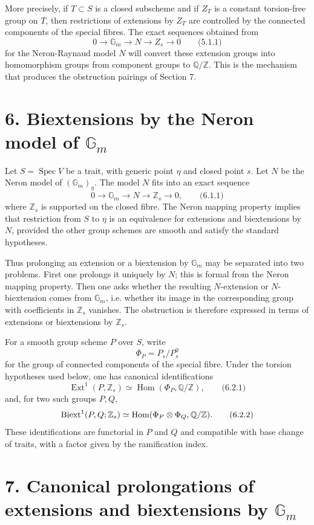 \documentclass[11pt]{article}
\providecommand{\Spec}{\operatorname{Spec}}
\providecommand{\Z}{\mathbb Z}
\providecommand{\Q}{\mathbb Q}
\providecommand{\Gm}{\mathbb G_m}
\providecommand{\Hom}{\operatorname{Hom}}
\providecommand{\Ext}{\operatorname{Ext}}
\begin{document}
More precisely, if \(T\subset S\) is a closed subscheme and if \(Z_T\) is a constant torsion-free group on \(T\), then restrictions of extensions by \(Z_T\) are controlled by the connected components of the special fibres.  The exact sequences obtained from
\[
        0\longrightarrow \Gm\longrightarrow N\longrightarrow Z_s\longrightarrow 0
\qquad\text{(5.1.1)}
\]
for the Neron-Raynaud model \(N\) will convert these extension groups into homomorphism groups from component groups to \(\Q/\Z\).  This is the mechanism that produces the obstruction pairings of Section 7.

\section*{6. Biextensions by the Neron model of \(\Gm\)}

Let \(S=\Spec V\) be a trait, with generic point \(\eta\) and closed point \(s\).  Let \(N\) be the Neron model of \((\Gm)_\eta\).  The model \(N\) fits into an exact sequence
\[
        0\longrightarrow \Gm\longrightarrow N\longrightarrow \Z_s\longrightarrow 0,
\qquad\text{(6.1.1)}
\]
where \(\Z_s\) is supported on the closed fibre.  The Neron mapping property implies that restriction from \(S\) to \(\eta\) is an equivalence for extensions and biextensions by \(N\), provided the other group schemes are smooth and satisfy the standard hypotheses.

Thus prolonging an extension or a biextension by \(\Gm\) may be separated into two problems.  First one prolongs it uniquely by \(N\); this is formal from the Neron mapping property.  Then one asks whether the resulting \(N\)-extension or \(N\)-biextension comes from \(\Gm\), i.e. whether its image in the corresponding group with coefficients in \(\Z_s\) vanishes.  The obstruction is therefore expressed in terms of extensions or biextensions by \(\Z_s\).

For a smooth group scheme \(P\) over \(S\), write
\[
        \Phi_P=P_s/P_s^0
\]
for the group of connected components of the special fibre.  Under the torsion hypotheses used below, one has canonical identifications
\[
        \Ext^1(P,\Z_s)\simeq \Hom(\Phi_P,\Q/\Z),
\qquad\text{(6.2.1)}
\]
and, for two such groups \(P,Q\),
\[
        \Biext^1(P,Q;\Z_s)\simeq \Hom(\Phi_P\otimes \Phi_Q,\Q/\Z).
\qquad\text{(6.2.2)}
\]
These identifications are functorial in \(P\) and \(Q\) and compatible with base change of traits, with a factor given by the ramification index.

\section*{7. Canonical prolongations of extensions and biextensions by \(\Gm\)}
\end{document}
